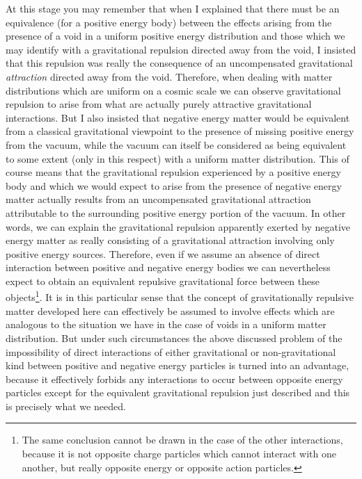 \documentclass[notitlepage,12pt]{report}
\begin{document}
At this stage you may remember that when I explained that there must be an equivalence (for a positive energy body) between the effects arising from the presence of a void in a uniform positive energy distribution and those which we may identify with a gravitational repulsion directed away from the void, I insisted that this repulsion was really the consequence of an uncompensated gravitational \textit{attraction} directed away from the void. Therefore, when dealing with matter distributions which are uniform on a cosmic scale we can observe gravitational repulsion to arise from what are actually purely attractive gravitational interactions. But I also insisted that negative energy matter would be equivalent from a classical gravitational viewpoint to the presence of missing positive energy from the vacuum, while the vacuum can itself be considered as being equivalent to some extent (only in this respect) with a uniform matter distribution. This of course means that the gravitational repulsion experienced by a positive energy body and which we would expect to arise from the presence of negative energy matter actually results from an uncompensated gravitational attraction attributable to the surrounding positive energy portion of the vacuum. In other words, we can explain the gravitational repulsion apparently exerted by negative energy matter as really consisting of a gravitational attraction involving only positive energy sources. Therefore, even if we assume an absence of direct interaction between positive and negative energy bodies we can nevertheless expect to obtain an equivalent repulsive gravitational force between these objects\footnote{The same conclusion cannot be drawn in the case of the other interactions, because it is not opposite charge particles which cannot interact with one another, but really opposite energy or opposite action particles.}. It is in this particular sense that the concept of gravitationally repulsive matter developed here can effectively be assumed to involve effects which are analogous to the situation we have in the case of voids in a uniform matter distribution. But under such circumstances the above discussed problem of the impossibility of direct interactions of either gravitational or non-gravitational kind between positive and negative energy particles is turned into an advantage, because it effectively forbids any interactions to occur between opposite energy particles except for the equivalent gravitational repulsion just described and this is precisely what we needed.
\end{document}
